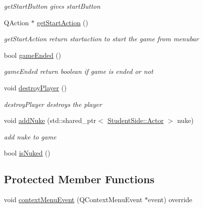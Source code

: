\begin{DoxyCompactItemize}
\begin{DoxyCompactList}\small\item\em get\-Start\-Button gives start\-Button \end{DoxyCompactList}\item 
Q\-Action $\ast$ \hyperlink{class_student_side_1_1_mainwindow_ae6bc2b06ca8ab22d7e5b5fbc10fbfe3b}{get\-Start\-Action} ()
\begin{DoxyCompactList}\small\item\em get\-Start\-Action return startaction to start the game from menubar \end{DoxyCompactList}\item 
bool \hyperlink{class_student_side_1_1_mainwindow_a413ff2fac6648addbd19f8a06a1305c7}{game\-Ended} ()
\begin{DoxyCompactList}\small\item\em game\-Ended return boolean if game is ended or not \end{DoxyCompactList}\item 
void \hyperlink{class_student_side_1_1_mainwindow_ace501f039bcececc0c7e891664bbaa50}{destroy\-Player} ()
\begin{DoxyCompactList}\small\item\em destroy\-Player destroys the player \end{DoxyCompactList}\item 
void \hyperlink{class_student_side_1_1_mainwindow_a66eadfc3c6e2f3e893b2142449b00f49}{add\-Nuke} (std\-::shared\-\_\-ptr$<$ \hyperlink{class_student_side_1_1_actor}{Student\-Side\-::\-Actor} $>$ nuke)
\begin{DoxyCompactList}\small\item\em add nuke to game \end{DoxyCompactList}\item 
bool \hyperlink{class_student_side_1_1_mainwindow_a9d393368717ac9f7cbaaae048b355e65}{is\-Nuked} ()
\end{DoxyCompactItemize}
\subsection*{Protected Member Functions}
\begin{DoxyCompactItemize}
\item 
void \hyperlink{class_student_side_1_1_mainwindow_a7dbeda19724837043388e76a17280284}{context\-Menu\-Event} (Q\-Context\-Menu\-Event $\ast$event) override
\end{DoxyCompactItemize}


